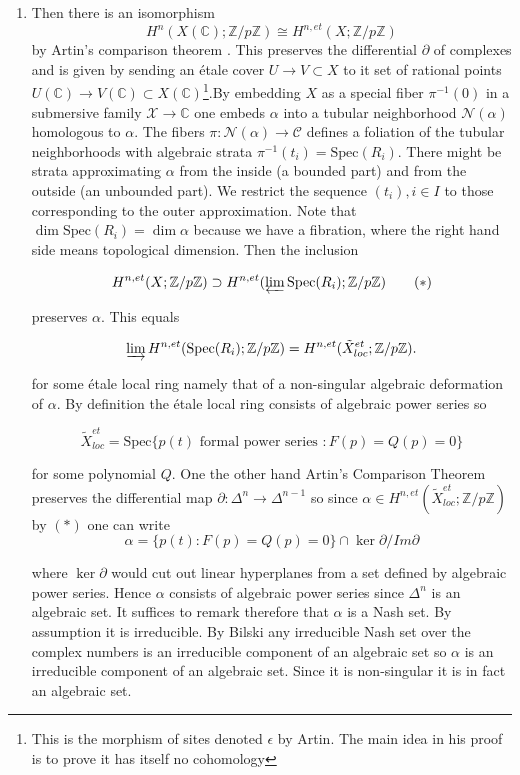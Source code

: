 \documentclass[10pt,a4paper]{amsart}
\begin{document}
\begin{enumerate}
    \item Then there is an isomorphism
$$H^n(X(\mathbb{C}); \mathbb{Z}/p\mathbb{Z})\cong H^{n, et}(X; \mathbb{Z}/p\mathbb{Z})$$
by Artin's comparison theorem \cite[SGA 4 XI Théorème 4.4]{SGA4}. This preserves the differential $\partial$ of complexes and is given by sending an étale cover $U\to V\subset X$ to it set of rational points $U(\mathbb{C})\to V(\mathbb{C})\subset X(\mathbb{C})$\footnote{This is the morphism of sites denoted $\epsilon$ by Artin. The main idea in his proof is to prove it has itself no cohomology}.By embedding $X$ as a special fiber $\pi^{-1}(0)$ in a submersive family $\mathcal{X}\to \mathbb{C}$ one embeds $\alpha$ into a tubular neighborhood $\mathcal{N}(\alpha)$ homologous to $\alpha$. The fibers $\pi: \mathcal{N}(\alpha)\to \mathcal{C}$ defines a foliation of the tubular neighborhoods with algebraic strata $\pi^{-1}(t_i)=\text{Spec}(R_i)$. There might be strata approximating $\alpha$
from the inside (a bounded part) and from the outside (an unbounded part). We restrict the sequence $(t_i), i\in I$ to those corresponding to the outer approximation. Note that $\dim \text{Spec}(R_i)=\dim \alpha$
because we have a fibration, where the right hand side means topological dimension. Then the inclusion

$$H^{n, et}(X; \mathbb{Z}/p\mathbb{Z})\supset H^{n, et}(\varprojlim \text{Spec}(R_i); \mathbb{Z}/p\mathbb{Z})\qquad (\ast)$$

preserves $\alpha$. This equals

$$\varinjlim H^{n, et}(\text{Spec}(R_i); \mathbb{Z}/p\mathbb{Z})=H^{n,et}(\tilde{X}_{loc}^{et}; \mathbb{Z}/p\mathbb{Z}).$$

for some étale local ring namely that of a non-singular algebraic deformation of $\alpha$. By definition the étale local ring consists of algebraic power series so

$$\tilde{X}_{loc}^{et}=\text{Spec}\{p(t)\text{ formal power series }: F(p)=Q(p)=0\}$$

for some polynomial $Q$. One the other hand Artin's Comparison Theorem preserves the differential map $\partial: \Delta^n\to \Delta^{n-1}$ so since $\alpha\in H^{n, et}(\tilde{X}_{loc}^{et}; \mathbb{Z}/p\mathbb{Z})$ by $(\ast)$ one can write
$$\alpha=\{p(t): F(p)=Q(p)=0\}\cap \ker\partial/Im \partial$$

where $\ker \partial$ would cut out linear hyperplanes from a set defined by algebraic power series. Hence $\alpha$ consists of algebraic power series since $\Delta^n$ is an algebraic set. It suffices to remark therefore that $\alpha$ is a Nash set. By assumption it is irreducible. By Bilski \cite[Theorem 2.1]{Bilski} any irreducible Nash set over the complex numbers is an irreducible component of an algebraic set so $\alpha$ is an irreducible component of an algebraic set. Since it is non-singular it is in fact an algebraic set. 


\end{enumerate}
\end{document}

